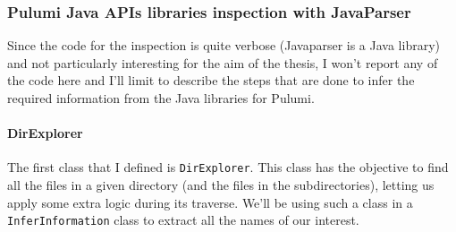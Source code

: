 \subsubsection{Pulumi Java APIs libraries inspection with JavaParser}
Since the code for the inspection is quite verbose (Javaparser is a Java library) and not particularly interesting for the aim of the thesis, I won't report any of the code here and I'll limit to describe the steps that are done to infer the required information from the Java libraries for Pulumi.

\paragraph{DirExplorer}
The first class that I defined is \texttt{DirExplorer}. This class has the objective to find all the files in a given directory (and the files in the subdirectories), letting us apply some extra logic during its traverse.
We'll be using such a class in a \texttt{InferInformation} class to extract all the names of our interest.\\

